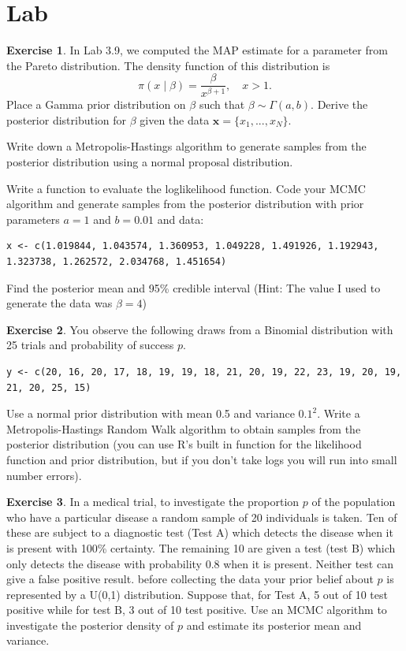 \documentclass[
]{book}
\theoremstyle{definition}
\theoremstyle{definition}
\theoremstyle{definition}
\newtheorem{exercise}{Exercise}[chapter]
\theoremstyle{definition}
\theoremstyle{remark}
\begin{document}
\hypertarget{lab-2}{%
\section{Lab}\label{lab-2}}

\begin{exercise}
In Lab 3.9, we computed the MAP estimate for a parameter from the Pareto distribution. The density function of this distribution is
\[
\pi(x \mid \beta) = \frac{\beta}{x^{\beta + 1}}, \quad x > 1. 
\]
Place a Gamma prior distribution on \(\beta\) such that \(\beta \sim \Gamma(a, b)\). Derive the posterior distribution for \(\beta\) given the data \(\boldsymbol{x} = \{x_1, ..., x_N\}\).

Write down a Metropolis-Hastings algorithm to generate samples from the posterior distribution using a normal proposal distribution.

Write a function to evaluate the loglikelihood function. Code your MCMC algorithm and generate samples from the posterior distribution with prior parameters \(a=1\) and \(b=0.01\) and data:

\begin{verbatim}
x <- c(1.019844, 1.043574, 1.360953, 1.049228, 1.491926, 1.192943, 1.323738, 1.262572, 2.034768, 1.451654)
\end{verbatim}

Find the posterior mean and 95\% credible interval
(Hint: The value I used to generate the data was \(\beta = 4\))
\end{exercise}

\begin{exercise}
You observe the following draws from a Binomial distribution with 25 trials and probability of success \(p\).

\begin{verbatim}
y <- c(20, 16, 20, 17, 18, 19, 19, 18, 21, 20, 19, 22, 23, 19, 20, 19, 21, 20, 25, 15)
\end{verbatim}

Use a normal prior distribution with mean 0.5 and variance \(0.1^2\). Write a Metropolis-Hastings Random Walk algorithm to obtain samples from the posterior distribution (you can use R's built in function for the likelihood function and prior distribution, but if you don't take logs you will run into small number errors).
\end{exercise}

\begin{exercise}
In a medical trial, to investigate the proportion \(p\) of the population who have a particular disease a random sample of 20 individuals is taken. Ten of these are subject to a diagnostic test (Test A) which detects the disease when it is present with 100\% certainty. The remaining 10 are given a test (test B) which only detects the disease with probability 0.8 when it is present. Neither test can give a false positive result. before collecting the data your prior belief about \(p\) is represented by a U(0,1) distribution. Suppose that, for Test A, 5 out of 10 test positive while for test B, 3 out of 10 test positive. Use an MCMC algorithm to investigate the posterior density of \(p\) and estimate its posterior mean and variance.
\end{exercise}
\end{document}
